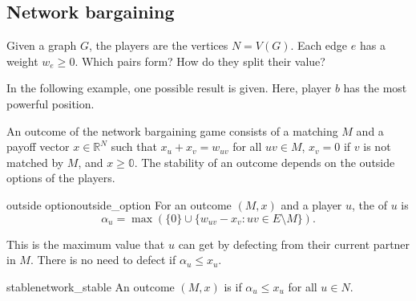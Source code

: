 \documentclass[12pt,letterpaper]{report}
\begin{document}
\subsection{Network bargaining}

Given a graph $G$, the players are the vertices $N = V(G)$.
Each edge $e$ has a weight $w_e \geq 0$.
Which pairs form?
How do they split their value?

\begin{ex}
  In the following example, one possible result is given.
  Here, player $b$ has the most powerful position.

  \begin{center}
  \end{center}
\end{ex}

An outcome of the network bargaining game consists of a matching $M$ and a payoff vector
$x \in \mathbb{R}^N$ such that $x_u + x_v = w_{uv}$ for all $uv \in M$, $x_v = 0$ if $v$ is not
matched by $M$, and $x \geq \mathbb{0}$.
The stability of an outcome depends on the outside options of the players.

\begin{defn}{outside option}{outside_option}
  For an outcome $(M, x)$ and a player $u$, the  of $u$ is
  \[
    \alpha_u = \max( \{0\} \cup \{ w_{uv} - x_v : uv \in E \setminus M \}).
  \]
\end{defn}

This is the maximum value that $u$ can get by defecting from their current partner in $M$.
There is no need to defect if $\alpha_u \leq x_u$.

\begin{defn}{stable}{network_stable}
  An outcome $(M, x)$ is  if $\alpha_u \leq x_u$ for all $u \in N$.
\end{defn}
\end{document}
